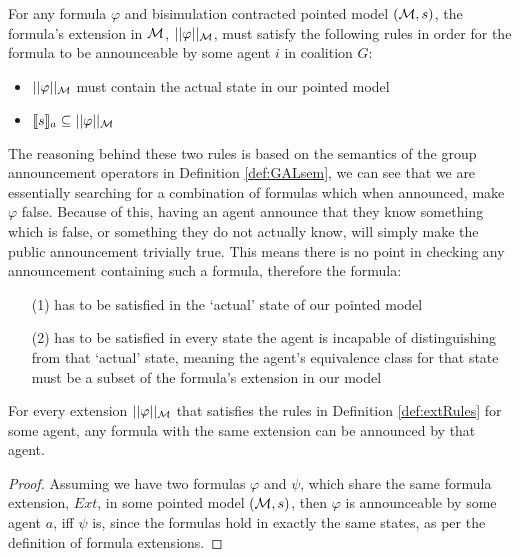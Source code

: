 
\begin{definition}\hfill
\label{def:extRules}
	For any formula $\varphi$ and bisimulation contracted pointed model $(\mathcal{M},s)$, the formula's extension in $\mathcal{M}$, $||\varphi||_{\mathcal{M}}$, must satisfy the following rules in order for the formula to be announceable by some agent $i$ in coalition $G$:
	\begin{itemize}
		\item $||\varphi||_{\mathcal{M}}$ must contain the actual state in our pointed model
		\item $\llbracket s\rrbracket_a \subseteq ||\varphi||_{\mathcal{M}}$
	\end{itemize}
\end{definition}

The reasoning behind these two rules is based on the semantics of the group announcement operators in Definition \ref{def:GALsem}, we can see that we are essentially searching for a combination of formulas which when announced, make $\varphi$ false. Because of this, having an agent announce that they know something which is false, or something they do not actually know, will simply make the public announcement trivially true. This means there is no point in checking any announcement containing such a formula, therefore the formula:

\begin{itemize}
	\item[(1)] has to be satisfied in the `actual' state of our pointed model
	\item[(2)] has to be satisfied in every state the agent is incapable of distinguishing from that `actual' state, meaning the agent's equivalence class for that state must be a subset of the formula's extension in our model
\end{itemize}

\begin{proposition}
For every extension $||\varphi||_{\mathcal{M}}$ that satisfies the rules in Definition \ref{def:extRules} for some agent, any formula with the same extension can be announced by that agent.
\end{proposition}

\begin{proof}
Assuming we have two formulas $\varphi$ and $\psi$, which share the same formula extension, $Ext$, in some pointed model $(\mathcal{M}, s)$, then $\varphi$ is announceable by some agent $a$, iff $\psi$ is, since the formulas hold in exactly the same states, as per the definition of formula extensions.
\end{proof}


